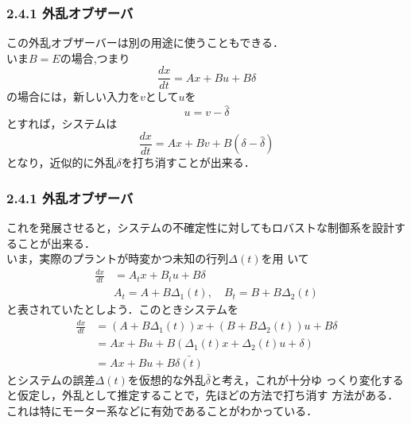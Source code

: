 \begin{frame}[t]
\frametitle{2.4.1 外乱オブザーバ}
この外乱オブザーバーは別の用途に使うこともできる．
\\[3mm]

いま$B=E$の場合,つまり
\begin{equation}
 \frac{dx}{dt} = A x + B u + B \delta
\end{equation}
の場合には，新しい入力を$v$として$u$を
\begin{equation}
 u = v - \hat{\delta}
\end{equation}
とすれば，システムは
\begin{equation}
 \frac{dx}{dt} = A x + B v + B (\delta- \hat{\delta})
\end{equation}
となり，近似的に外乱$\delta$を打ち消すことが出来る．

\end{frame}

\begin{frame}[t]
\frametitle{2.4.1 外乱オブザーバ}
これを発展させると，システムの不確定性に対してもロバストな制御系を設計す
ることが出来る．
\\[3mm]

いま，実際のプラントが時変かつ未知の行列$\Delta(t)$を用
いて
\begin{align}
  \frac{dx}{dt} & = A_t x + B_t u + B \delta 
\\
  & A_t = A + B \Delta_1(t), \quad B_t = B + B\Delta_2(t)
\nonumber 
\end{align}
と表されていたとしよう．このときシステムを
\begin{align}
 \frac{dx}{dt}
  &= (A + B \Delta_1(t))x + (B + B\Delta_2(t)) u + B \delta \nonumber \\
 &= A x + B u + B (\Delta_1(t) x + \Delta_2(t) u +\delta) \nonumber \\
 &= Ax + Bu + B \bar{\delta(t)}
\end{align}
とシステムの誤差$\Delta(t)$を仮想的な外乱$\bar{\delta}$と考え，これが十分ゆ
っくり変化すると仮定し，外乱として推定することで，先ほどの方法で打ち消す
方法がある．これは特にモーター系などに有効であることがわかっている．




\end{frame}


